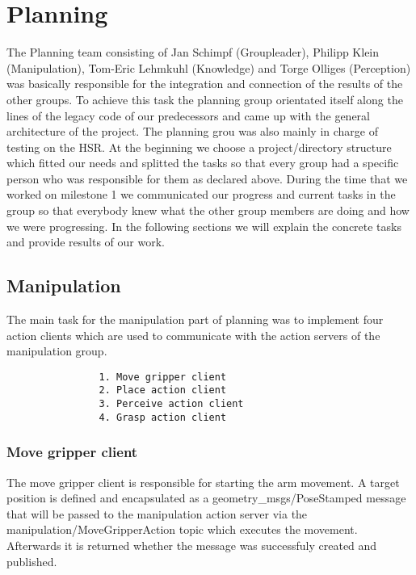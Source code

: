 \documentclass[main.tex]{subfiles}
\begin{document}
	
	\chapter{Planning}
	
	 The Planning team consisting of Jan Schimpf (Groupleader), Philipp Klein (Manipulation), Tom-Eric Lehmkuhl (Knowledge) and Torge Olliges (Perception) was basically responsible for the integration and connection of the results of the other groups. To achieve this task the planning group orientated itself along the lines of the legacy code of our predecessors and came up with the general architecture of the project. The planning grou was also mainly in charge of testing on the HSR. At the beginning we choose a project/directory structure which fitted our needs and splitted the tasks so that every group had a specific person who was responsible for them as declared above. During the time that we worked on milestone 1 we communicated our progress and current tasks in the group so that everybody knew what the other group members are doing and how we were progressing. In the following sections we will explain the concrete tasks and provide results of our work.

\section{Manipulation}

                The main task for the manipulation part of planning was to implement four action clients which are used to communicate with the action servers of the manipulation group.
		\begin{lstlisting}
                1. Move gripper client
                2. Place action client
                3. Perceive action client
                4. Grasp action client
		\end{lstlisting}

		\subsection{Move gripper client}

		The move gripper client is responsible for starting the arm movement. A target position is defined and encapsulated as a geometry\_msgs/PoseStamped message that will be passed to the manipulation action server via the manipulation/MoveGripperAction topic which executes the movement. Afterwards it is returned whether the message was successfuly created and published. 
\end{document}
